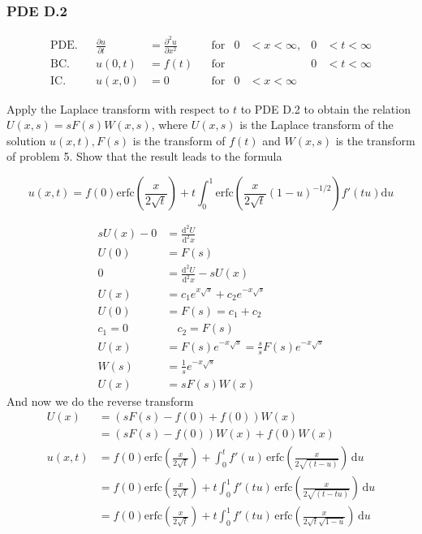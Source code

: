 \documentclass{article}
\begin{document}
\subsubsection*{PDE D.2}
\begin{align*}
  \text{PDE.}&&\frac{\partial u}{\partial t}&=\frac{\partial^2u}{\partial x^2}&&\text{for}&0&<x<\infty,&0&<t<\infty\\
  \text{BC.}&&u(0,t)&=f(t)&&\text{for}&&&0&<t<\infty\\
  \text{IC.}&&u(x,0)&=0&&\text{for}&0&<x<\infty
\end{align*}

Apply the Laplace transform with respect to $t$ to PDE D.2 to obtain the relation $U(x,s)=sF(s)W(x,s)$, where $U(x,s)$ is the Laplace transform of the solution $u(x,t), F(s)$ is the transform of $f(t)$ and $W(x,s)$ is the transform of problem 5. Show that the result leads to the formula

\[u(x,t)=f(0)\text{erfc}\left(\frac{x}{2\sqrt{t}}\right)+t\int_0^1{\text{erfc}\left(\frac{x}{2\sqrt{t}}(1-u)^{-1/2}\right)f'(tu)\mathrm{d}u}\]

\begin{align*}
  sU(x)-0&=\frac{\mathrm{d}^2U}{\mathrm{d}^2x}\\
  U(0)&=F(s)\\
  0&=\frac{\mathrm{d}^2U}{\mathrm{d}^2x}-sU(x)\\
  U(x)&=c_1e^{x\sqrt{s}}+c_2e^{-x\sqrt{s}}\\
  U(0)&=F(s)=c_1+c_2\\
  c_1=0&\quad c_2=F(s)\\
  U(x)&=F(s)e^{-x\sqrt{s}}=\frac{s}{s}F(s)e^{-x\sqrt{s}}\\
  W(s)&=\frac{1}{s}e^{-x\sqrt{s}}\\
  U(x)&=sF(s)W(x)
\end{align*}
And now we do the reverse transform
\begin{align*}
  U(x)&=(sF(s)-f(0)+f(0))W(x)\\
  &=(sF(s)-f(0))W(x)+f(0)W(x)\\
  u(x,t)&=f(0)\text{erfc}\left(\frac{x}{2\sqrt{t}}\right)+\int_0^t{f'(u)\,\text{erfc}\left(\frac{x}{2\sqrt{(t-u)}}\right)\,\mathrm{d}u}\\
  &=f(0)\text{erfc}\left(\frac{x}{2\sqrt{t}}\right)+t\int_0^1{f'(tu)\,\text{erfc}\left(\frac{x}{2\sqrt{(t-tu)}}\right)\,\mathrm{d}u}\\
  &=f(0)\text{erfc}\left(\frac{x}{2\sqrt{t}}\right)+t\int_0^1{f'(tu)\,\text{erfc}\left(\frac{x}{2\sqrt{t}\sqrt{1-u}}\right)\,\mathrm{d}u}\\
\end{align*}
\end{document}
